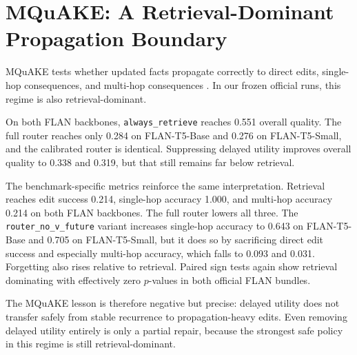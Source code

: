 \section{MQuAKE: A Retrieval-Dominant Propagation Boundary}

MQuAKE tests whether updated facts propagate correctly to direct edits, single-hop consequences, and multi-hop consequences \citep{zhong2023mquake}. In our frozen official runs, this regime is also retrieval-dominant.

\begin{table}[h]
\centering
\small

\caption{Official MQuAKE results. Retrieval remains strongest on overall quality, direct edit success, and multi-hop consequences. Suppressing delayed utility improves on the full router but still does not overtake retrieval.}
\label{tab:mquake-main}
\end{table}

On both FLAN backbones, \texttt{always\_retrieve} reaches 0.551 overall quality. The full router reaches only 0.284 on FLAN-T5-Base and 0.276 on FLAN-T5-Small, and the calibrated router is identical. Suppressing delayed utility improves overall quality to 0.338 and 0.319, but that still remains far below retrieval.

The benchmark-specific metrics reinforce the same interpretation. Retrieval reaches edit success 0.214, single-hop accuracy 1.000, and multi-hop accuracy 0.214 on both FLAN backbones. The full router lowers all three. The \texttt{router\_no\_v\_future} variant increases single-hop accuracy to 0.643 on FLAN-T5-Base and 0.705 on FLAN-T5-Small, but it does so by sacrificing direct edit success and especially multi-hop accuracy, which falls to 0.093 and 0.031. Forgetting also rises relative to retrieval. Paired sign tests again show retrieval dominating with effectively zero \(p\)-values in both official FLAN bundles.

The MQuAKE lesson is therefore negative but precise: delayed utility does not transfer safely from stable recurrence to propagation-heavy edits. Even removing delayed utility entirely is only a partial repair, because the strongest safe policy in this regime is still retrieval-dominant.
